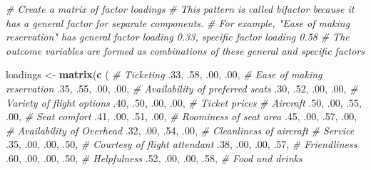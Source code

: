 \documentclass[]{book}
\newenvironment{Shaded}{\begin{snugshade}}{\end{snugshade}}
\newcommand{\KeywordTok}[1]{\textcolor[rgb]{0.13,0.29,0.53}{\textbf{{#1}}}}
\newcommand{\DecValTok}[1]{\textcolor[rgb]{0.00,0.00,0.81}{{#1}}}
\newcommand{\StringTok}[1]{\textcolor[rgb]{0.31,0.60,0.02}{{#1}}}
\newcommand{\CommentTok}[1]{\textcolor[rgb]{0.56,0.35,0.01}{\textit{{#1}}}}
\newcommand{\NormalTok}[1]{{#1}}
\theoremstyle{definition}
\theoremstyle{definition}
\theoremstyle{remark}
\begin{document}
\begin{Shaded}
\begin{Highlighting}[]
\CommentTok{# Create a matrix of factor loadings}
\CommentTok{# This pattern is called bifactor because it has a general factor for separate components.}
\CommentTok{# For example, "Ease of making reservation" has general factor loading 0.33, specific factor loading 0.58}
\CommentTok{# The outcome variables are formed as combinations of these general and specific factors}

\NormalTok{loadings <-}\StringTok{ }\KeywordTok{matrix}\NormalTok{(}\KeywordTok{c} \NormalTok{(}
  \CommentTok{# Ticketing}
  \NormalTok{.}\DecValTok{33}\NormalTok{, .}\DecValTok{58}\NormalTok{, .}\DecValTok{00}\NormalTok{, .}\DecValTok{00}\NormalTok{,  }\CommentTok{# Ease of making reservation }
  \NormalTok{.}\DecValTok{35}\NormalTok{, .}\DecValTok{55}\NormalTok{, .}\DecValTok{00}\NormalTok{, .}\DecValTok{00}\NormalTok{,  }\CommentTok{# Availability of preferred seats}
  \NormalTok{.}\DecValTok{30}\NormalTok{, .}\DecValTok{52}\NormalTok{, .}\DecValTok{00}\NormalTok{, .}\DecValTok{00}\NormalTok{,  }\CommentTok{# Variety of flight options}
  \NormalTok{.}\DecValTok{40}\NormalTok{, .}\DecValTok{50}\NormalTok{, .}\DecValTok{00}\NormalTok{, .}\DecValTok{00}\NormalTok{,  }\CommentTok{# Ticket prices}
  \CommentTok{# Aircraft}
  \NormalTok{.}\DecValTok{50}\NormalTok{, .}\DecValTok{00}\NormalTok{, .}\DecValTok{55}\NormalTok{, .}\DecValTok{00}\NormalTok{,  }\CommentTok{# Seat comfort}
  \NormalTok{.}\DecValTok{41}\NormalTok{, .}\DecValTok{00}\NormalTok{, .}\DecValTok{51}\NormalTok{, .}\DecValTok{00}\NormalTok{,  }\CommentTok{# Roominess of seat area}
  \NormalTok{.}\DecValTok{45}\NormalTok{, .}\DecValTok{00}\NormalTok{, .}\DecValTok{57}\NormalTok{, .}\DecValTok{00}\NormalTok{,  }\CommentTok{# Availability of Overhead}
  \NormalTok{.}\DecValTok{32}\NormalTok{, .}\DecValTok{00}\NormalTok{, .}\DecValTok{54}\NormalTok{, .}\DecValTok{00}\NormalTok{,  }\CommentTok{# Cleanliness of aircraft}
  \CommentTok{# Service}
  \NormalTok{.}\DecValTok{35}\NormalTok{, .}\DecValTok{00}\NormalTok{, .}\DecValTok{00}\NormalTok{, .}\DecValTok{50}\NormalTok{,  }\CommentTok{# Courtesy of flight attendant}
  \NormalTok{.}\DecValTok{38}\NormalTok{, .}\DecValTok{00}\NormalTok{, .}\DecValTok{00}\NormalTok{, .}\DecValTok{57}\NormalTok{,  }\CommentTok{# Friendliness}
  \NormalTok{.}\DecValTok{60}\NormalTok{, .}\DecValTok{00}\NormalTok{, .}\DecValTok{00}\NormalTok{, .}\DecValTok{50}\NormalTok{,  }\CommentTok{# Helpfulness}
  \NormalTok{.}\DecValTok{52}\NormalTok{, .}\DecValTok{00}\NormalTok{, .}\DecValTok{00}\NormalTok{, .}\DecValTok{58}\NormalTok{,  }\CommentTok{# Food and drinks}

\end{Highlighting}
\end{Shaded}
\end{document}
